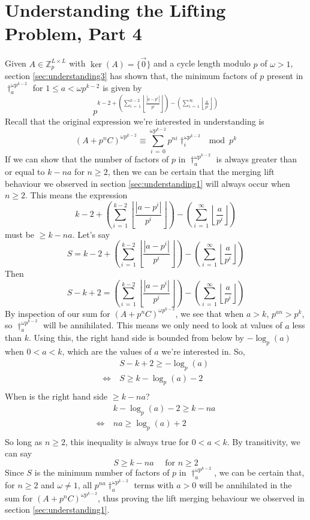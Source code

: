 \documentclass[a4paper, 12pt, reqno]{amsart}
\newcommand\floor[1]{\left\lfloor #1 \right\rfloor}
\begin{document}
	\section{Understanding the Lifting Problem, Part 4}
		\label{sec:understanding4}
		Given $A \in \mathds{Z}_p^{L \times L}$ with $\ker(A) = \{\vec{0}\}$ and a cycle length modulo $p$ of $\omega > 1$, section \ref{sec:understanding3} has shown that, 
		the minimum factors of $p$ present in $\dag_a^{\omega p^{k-2}}$ for $1 \leq a < \omega p^{k-2}$ is given by
		\[
			p^{k-2 + \left(\sum_{i\,=\,1}^{k-2} \floor{\frac{|a-p^i|}{p^i}} \right) - \left(\sum_{i\,=\,1}^\infty \floor{\frac{a}{p^i}} \right)}
		\]
		Recall that the original expression we're interested in understanding is
		\[
			(A + p^nC)^{\omega p^{k-2}} \equiv \sum_{i\,=\,0}^{\omega p^{k-2}} p^{ni} \dag_i^{\omega p^{k-2}} \mod{p^k}
		\]
		If we can show that the number of factors of $p$ in $\dag_a^{\omega p^{k-2}}$ is always greater than or equal to $k-na$ for $n \geq 2$, then we can be certain that 
		the merging lift behaviour we observed in section \ref{sec:understanding1} will always occur when $n \geq 2$. This means the expression
		\[
			k-2 + \left(\sum_{i\,=\,1}^{k-2} \floor{\frac{|a-p^i|}{p^i}} \right) - \left(\sum_{i\,=\,1}^\infty \floor{\frac{a}{p^i}} \right)
		\]
		must be $\geq k-na$. Let's say
		\[
			S = k-2 + \left(\sum_{i\,=\,1}^{k-2} \floor{\frac{|a-p^i|}{p^i}} \right) - \left(\sum_{i\,=\,1}^\infty \floor{\frac{a}{p^i}} \right)
		\]
		Then
		\[
			S-k+2 = \left(\sum_{i\,=\,1}^{k-2} \floor{\frac{|a-p^i|}{p^i}} \right) - \left(\sum_{i\,=\,1}^\infty \floor{\frac{a}{p^i}} \right)
		\]
		By inspection of our sum for $(A+p^nC)^{\omega p^{k-2}}$, we see that when $a > k$, $p^{an} > p^k$, so $\dag_a^{\omega p^{k-2}}$ will be annihilated. This means we 
		only need to look at values of $a$ less than $k$. Using this, the right hand side is bounded from below by $-\log_p(a)$ when $0 < a < k$, which are the values of $a$
		we're interested in. So,
		\begin{align*}
			               \ & S-k+2 \geq -\log_p(a) \\
			\Leftrightarrow\ & S \geq k-\log_p(a)-2 \\
		\end{align*}
		When is the right hand side $\geq k-na$?
		\begin{align*}
			                 & k-\log_p(a)-2 \geq k-na \\
			\Leftrightarrow\ & na \geq \log_p(a)+2 \\
		\end{align*}
		So long as $n \geq 2$, this inequality is always true for $0 < a < k$. By transitivity, we can say
		\[
			S \geq k - na \quad\text{ for } n \geq 2
		\]
		Since $S$ is the minimum number of factors of $p$ in $\dag_a^{\omega p^{k-2}}$, we can be certain that, for $n \geq 2$ and $\omega \neq 1$, all 
		$p^{na}\dag_a^{\omega p^{k-2}}$ terms with $a > 0$ will be annihilated in the sum for $(A+p^nC)^{\omega p^{k-2}}$, thus proving the lift merging behaviour we observed 
		in section \ref{sec:understanding1}.
		
\end{document}
